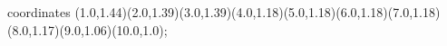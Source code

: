 					coordinates { (1.0,1.44)(2.0,1.39)(3.0,1.39)(4.0,1.18)(5.0,1.18)(6.0,1.18)(7.0,1.18)(8.0,1.17)(9.0,1.06)(10.0,1.0)};